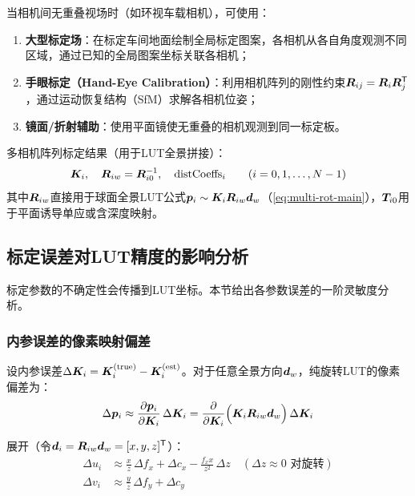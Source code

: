 当相机间无重叠视场时（如环视车载相机），可使用：
\begin{enumerate}[leftmargin=*]
  \item \textbf{大型标定场}：在标定车间地面绘制全局标定图案，各相机从各自角度观测不同区域，通过已知的全局图案坐标关联各相机；
  \item \textbf{手眼标定（Hand-Eye Calibration）}：利用相机阵列的刚性约束$\bm{R}_{ij} = \bm{R}_i\bm{R}_j^{\mathsf{T}}$，通过运动恢复结构（SfM）求解各相机位姿；
  \item \textbf{镜面/折射辅助}：使用平面镜使无重叠的相机观测到同一标定板。
\end{enumerate}

\begin{finalbox}
多相机阵列标定结果（用于LUT全景拼接）：
\[
\bm{K}_i,\quad \bm{R}_{iw} = \bm{R}_{i0}^{-1},\quad \text{distCoeffs}_i \qquad (i = 0,1,\dots,N-1)
\]
其中$\bm{R}_{iw}$直接用于球面全景LUT公式$\bm{p}_i \sim \bm{K}_i\bm{R}_{iw}\bm{d}_w$（\cref{eq:multi-rot-main}），$\bm{T}_{i0}$用于平面诱导单应或含深度映射。
\end{finalbox}

\subsection{标定误差对LUT精度的影响分析}
\label{sec:calib-error-propagation}

标定参数的不确定性会传播到LUT坐标。本节给出各参数误差的一阶灵敏度分析。

\subsubsection{内参误差的像素映射偏差}

设内参误差$\Delta\bm{K}_i = \bm{K}_i^{\text{(true)}} - \bm{K}_i^{\text{(est)}}$。对于任意全景方向$\bm{d}_w$，纯旋转LUT的像素偏差为：
\begin{equation}
\Delta\bm{p}_i \approx \frac{\partial \bm{p}_i}{\partial \bm{K}_i}\,\Delta\bm{K}_i
=
\frac{\partial}{\partial\bm{K}_i}\Bigl(\bm{K}_i\bm{R}_{iw}\bm{d}_w\Bigr)\,\Delta\bm{K}_i
\label{eq:k-error}
\end{equation}

展开（令$\bm{d}_i = \bm{R}_{iw}\bm{d}_w = [x,y,z]^{\mathsf{T}}$）：
\begin{align}
\Delta u_i &\approx \frac{x}{z}\,\Delta f_x + \Delta c_x
            - \frac{f_x x}{z^2}\,\Delta z \quad(\Delta z\approx 0\text{ 对旋转}) \label{eq:du-dk} \\
\Delta v_i &\approx \frac{y}{z}\,\Delta f_y + \Delta c_y \label{eq:dv-dk}
\end{align}

